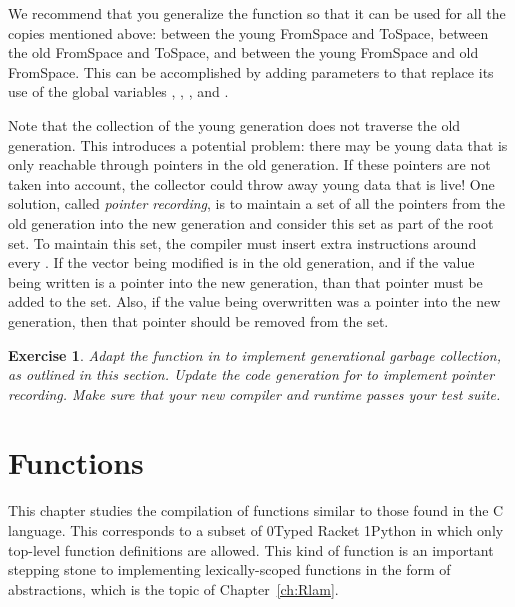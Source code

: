 \documentclass[7x10]{TimesAPriori_MIT}%
\def\racketEd{0}
\def\pythonEd{1}
\def\edition{1}
\newcommand{\racket}[1]{{\if\edition\racketEd{#1}\fi}}
\newcommand{\python}[1]{{\if\edition\pythonEd #1\fi}}
\newtheorem{exercise}[theorem]{Exercise}
\begin{document}
{We recommend that you generalize the  function so that it
can be used for all the copies mentioned above: between the young
FromSpace and ToSpace, between the old FromSpace and ToSpace, and
between the young FromSpace and old FromSpace. This can be
accomplished by adding parameters to  that replace its
use of the global variables ,
, , and .

Note that the collection of the young generation does not traverse the
old generation. This introduces a potential problem: there may be
young data that is only reachable through pointers in the old
generation. If these pointers are not taken into account, the
collector could throw away young data that is live!  One solution,
called \emph{pointer recording}, is to maintain a set of all the
pointers from the old generation into the new generation and consider
this set as part of the root set.  To maintain this set, the compiler
must insert extra instructions around every . If the
vector being modified is in the old generation, and if the value being
written is a pointer into the new generation, than that pointer must
be added to the set. Also, if the value being overwritten was a
pointer into the new generation, then that pointer should be removed
from the set.

\begin{exercise}\normalfont
  Adapt the  function in  to implement
  generational garbage collection, as outlined in this section.
  Update the code generation for  to implement
  pointer recording. Make sure that your new compiler and runtime
  passes your test suite.
\end{exercise}

\fi}


\chapter{Functions}
\label{ch:Rfun}

This chapter studies the compilation of functions similar to those
found in the C language. This corresponds to a subset of \racket{Typed
  Racket} \python{Python} in which only top-level function definitions
are allowed. This kind of function is an important stepping stone to
implementing lexically-scoped functions in the form of 
abstractions, which is the topic of Chapter~\ref{ch:Rlam}.
\end{document}
